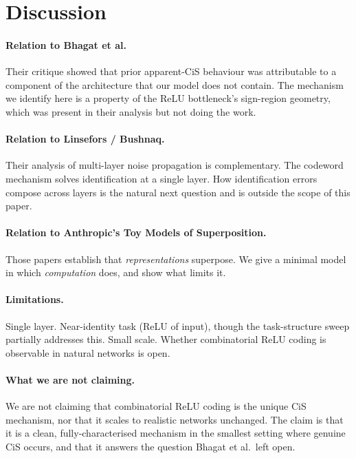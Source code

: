 \documentclass[11pt]{article}
\begin{document}
\section{Discussion}

\paragraph{Relation to Bhagat et al.}
Their critique showed that prior apparent-CiS behaviour was attributable to a component of the architecture that our model does not contain.
The mechanism we identify here is a property of the ReLU bottleneck's sign-region geometry, which was present in their analysis but not doing the work.

\paragraph{Relation to Linsefors / Bushnaq.}
Their analysis of multi-layer noise propagation is complementary.
The codeword mechanism solves identification at a single layer.
How identification errors compose across layers is the natural next question and is outside the scope of this paper.

\paragraph{Relation to Anthropic's Toy Models of Superposition.}
Those papers establish that \emph{representations} superpose.
We give a minimal model in which \emph{computation} does, and show what limits it.

\paragraph{Limitations.}
Single layer.
Near-identity task (ReLU of input), though the task-structure sweep partially addresses this.
Small scale.
Whether combinatorial ReLU coding is observable in natural networks is open.

\paragraph{What we are not claiming.}
We are not claiming that combinatorial ReLU coding is the unique CiS mechanism, nor that it scales to realistic networks unchanged.
The claim is that it is a clean, fully-characterised mechanism in the smallest setting where genuine CiS occurs, and that it answers the question Bhagat et al.\ left open.
\end{document}
